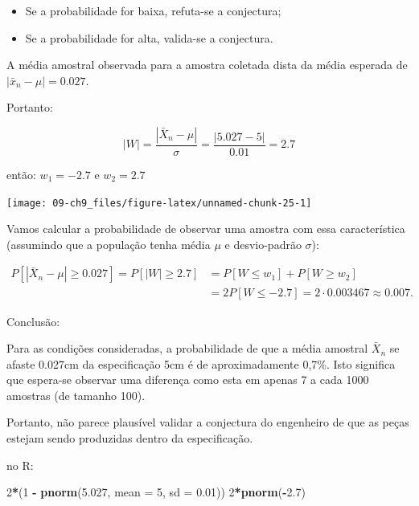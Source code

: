 \documentclass[
]{book}
\newenvironment{Shaded}{\begin{snugshade}}{\end{snugshade}}
\newcommand{\DataTypeTok}[1]{\textcolor[rgb]{0.13,0.29,0.53}{#1}}
\newcommand{\DecValTok}[1]{\textcolor[rgb]{0.00,0.00,0.81}{#1}}
\newcommand{\FloatTok}[1]{\textcolor[rgb]{0.00,0.00,0.81}{#1}}
\newcommand{\KeywordTok}[1]{\textcolor[rgb]{0.13,0.29,0.53}{\textbf{#1}}}
\newcommand{\NormalTok}[1]{#1}
\newcommand{\OperatorTok}[1]{\textcolor[rgb]{0.81,0.36,0.00}{\textbf{#1}}}
\newcommand{\StringTok}[1]{\textcolor[rgb]{0.31,0.60,0.02}{#1}}
\providecommand{\tightlist}{%
  \setlength{\itemsep}{0pt}\setlength{\parskip}{0pt}}
\theoremstyle{definition}
\theoremstyle{definition}
\theoremstyle{definition}
\theoremstyle{remark}
\begin{document}
\begin{itemize}
\tightlist
\item
  Se a probabilidade for baixa, refuta-se a conjectura;
\item
  Se a probabilidade for alta, valida-se a conjectura.
\end{itemize}

A média amostral observada para a amostra coletada dista da média esperada de \(|\bar{x}_n - \mu| = 0.027\).

Portanto:

\[|W| = \frac{|\bar{X}_n - \mu|}{\sigma} = \frac{|5.027 - 5|}{0.01} = 2.7\]

então: \(w_1 = -2.7\) e \(w_2 = 2.7\)

\begin{center}\texttt{[image: 09-ch9\_files/figure-latex/unnamed-chunk-25-1]} \end{center}

Vamos calcular a probabilidade de observar uma amostra com essa característica (assumindo que a população tenha média \(\mu\) e desvio-padrão \(\sigma\)):

\begin{align*}
  P[|\bar{X}_n - \mu| \geq 0.027] = P[|W| \geq 2.7]
  &= P[W \leq w_1] + P[W \geq w_2] \\
  &= 2 P[W \leq -2.7] = 2 \cdot 0.003467 \approx 0.007.
\end{align*}

Conclusão:

Para as condições consideradas, a probabilidade de que a média amostral \(\bar{X}_n\) se afaste 0.027cm da especificação 5cm é de aproximadamente 0,7\%. Isto significa que espera-se observar uma diferença como esta em apenas 7 a cada 1000 amostras (de tamanho 100).

Portanto, não parece plausível validar a conjectura do engenheiro de que as peças estejam sendo produzidas dentro da especificação.

no R:

\begin{Shaded}
\begin{Highlighting}[]
\DecValTok{2}\OperatorTok{*}\NormalTok{(}\DecValTok{1} \OperatorTok{-}\StringTok{ }\KeywordTok{pnorm}\NormalTok{(}\FloatTok{5.027}\NormalTok{, }\DataTypeTok{mean =} \DecValTok{5}\NormalTok{, }\DataTypeTok{sd =} \FloatTok{0.01}\NormalTok{))}
\DecValTok{2}\OperatorTok{*}\KeywordTok{pnorm}\NormalTok{(}\OperatorTok{-}\FloatTok{2.7}\NormalTok{)}
\end{Highlighting}
\end{Shaded}
\end{document}
